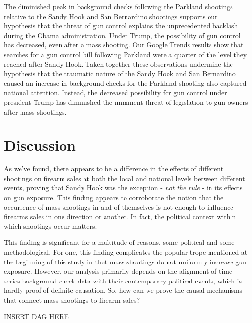 \documentclass[9pt,twocolumn,twoside,lineno]{pnas-new}
\begin{document}
The diminished peak in background checks following the Parkland shootings relative to the Sandy Hook and San Bernardino shootings supports our hypothesis that the threat of gun control explains the unprecedented backlash during the Obama administration. Under Trump, the possibility of gun control has decreased, even after a mass shooting. Our Google Trends results show that searches for a gun control bill following Parkland were a quarter of the level they reached after Sandy Hook. Taken together these observations undermine the hypothesis that the traumatic nature of the Sandy Hook and San Bernardino caused an increase in background checks for the Parkland shooting also captured national attention. Instead,  the decreased possibility for gun control under president Trump has diminished the imminent threat of legislation to gun owners after mass shootings. 


\section{Discussion}

As we've found, there appears to be a difference in the effects of different shootings on firearm sales at both the local and national levels between different events, proving that Sandy Hook was the exception - \textit{not the rule} - in its effects on gun exposure. This finding appears to corroborate the notion that the occurrence of mass shootings in and of themselves is not enough to influence firearms sales in one direction or another. In fact, the political context within which shootings occur matters. 

This finding is significant for a multitude of reasons, some political and some methodological. For one, this finding complicates the popular trope mentioned at the beginning of this study in that mass shootings do not uniformly increase gun exposure. However, our analysis primarily depends on the alignment of time-series background check data with their contemporary political events, which is hardly proof of definite causation. So, how can we prove the causal mechanisms that connect mass shootings to firearm sales?

INSERT DAG HERE
\end{document}
